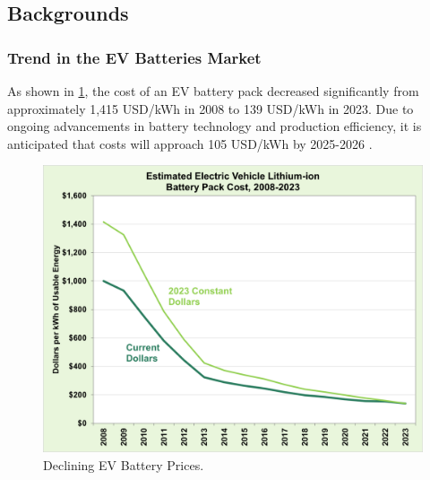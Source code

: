 \documentclass[11pt,twocolumn]{article}
\begin{document}
        \subsection{Backgrounds}
            \subsubsection{Trend in the EV Batteries Market}
                As shown in \cref{batCost}, the cost of an EV battery pack decreased significantly from approximately 1,415 USD/kWh in 2008 to 139 USD/kWh in 2023.
                Due to ongoing advancements in battery technology and production efficiency, it is anticipated that costs will approach 105 USD/kWh by 2025-2026 \cite{doe23}\cite{nrel23}.
                \begin{figure}[h]
                    \centering
                    \includegraphics[width=.8\columnwidth]{batCost.png}
                    \caption{Declining EV Battery Prices.}
                    \label{batCost}
                \end{figure}
\end{document}
